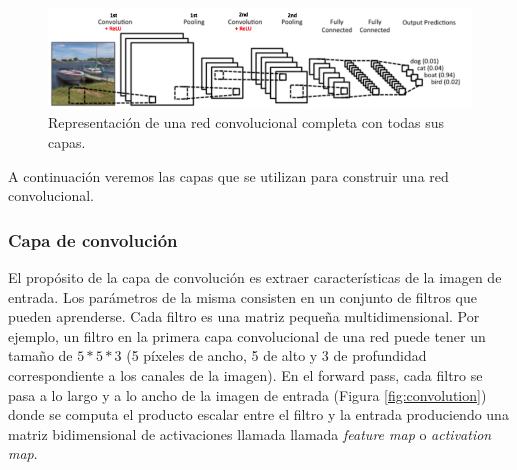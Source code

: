 \documentclass[spanish]{report}
\begin{document}
\begin{figure}[h]
\centering
 \includegraphics[width=\linewidth]{convnet.png}
   \caption[Representación de una red convolucional completa con todas sus capas.]{Representación de una red convolucional completa con todas sus capas. \protect\footnotemark}
  \label{fig:red_conv}
\end{figure}


A continuación veremos las capas que se utilizan para construir una red convolucional.

\subsubsection{Capa de convolución}

El propósito de la capa de convolución es extraer características de la imagen de entrada. Los parámetros de la misma consisten en un conjunto de filtros que pueden aprenderse. Cada filtro es una matriz pequeña multidimensional. Por ejemplo, un filtro en la primera capa convolucional de una red puede tener un tamaño de $5*5*3$ (5 píxeles de ancho, 5 de alto y 3 de profundidad correspondiente a los canales de la imagen). En el forward pass, cada filtro se pasa a lo largo y a lo ancho de la imagen de entrada (Figura \ref{fig:convolution}) donde se computa el producto escalar entre el filtro y la entrada produciendo una matriz bidimensional de activaciones llamada llamada \textit{feature map} o \textit{activation map}.
\end{document}
